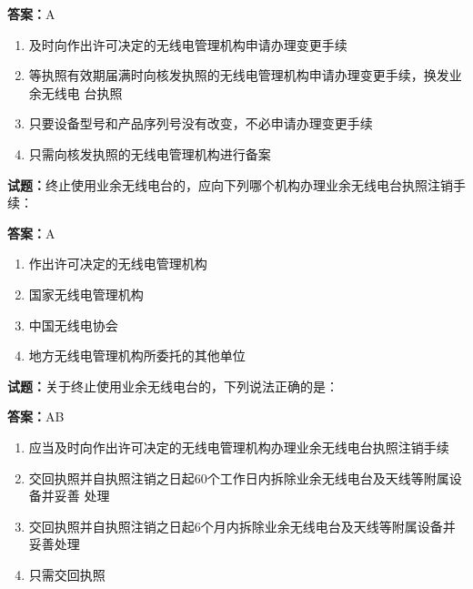 \documentclass{ctexbook}
\begin{document}
\textbf{答案：}A 

\begin{enumerate}[leftmargin=3em]
  \item 及时向作出许可决定的无线电管理机构申请办理变更手续 

  \item 等执照有效期届满时向核发执照的无线电管理机构申请办理变更手续，换发业余无线电
台执照 

  \item 只要设备型号和产品序列号没有改变，不必申请办理变更手续 


  \item 只需向核发执照的无线电管理机构进行备案 

\end{enumerate}





\vspace{1em}

\textbf{试题：}终止使用业余无线电台的，应向下列哪个机构办理业余无线电台执照注销手续： 

\textbf{答案：}A 

\begin{enumerate}[leftmargin=3em]
  \item 作出许可决定的无线电管理机构 

  \item 国家无线电管理机构 

  \item 中国无线电协会 

  \item 地方无线电管理机构所委托的其他单位 

\end{enumerate}





\vspace{1em}

\textbf{试题：}关于终止使用业余无线电台的，下列说法正确的是： 

\textbf{答案：}AB 

\begin{enumerate}[leftmargin=3em]
  \item 应当及时向作出许可决定的无线电管理机构办理业余无线电台执照注销手续 

  \item 交回执照并自执照注销之日起60个工作日内拆除业余无线电台及天线等附属设备并妥善
处理 

  \item 交回执照并自执照注销之日起6个月内拆除业余无线电台及天线等附属设备并妥善处理 

  \item 只需交回执照 

\end{enumerate}
\end{document}
